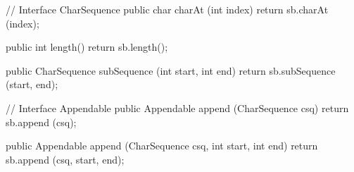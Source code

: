 %
\begin{hide}\begin{code}
   // Interface CharSequence
   public char charAt (int index) {
      return sb.charAt (index);
   }

   public int length() {
      return sb.length();
   }

   public CharSequence subSequence (int start, int end) {
      return sb.subSequence (start, end);
   }

   // Interface Appendable
   public Appendable append (CharSequence csq) {
      return sb.append (csq);
   }

   public Appendable append (CharSequence csq, int start, int end) {
      return sb.append (csq, start, end);
   }
\end{code}\end{hide}

